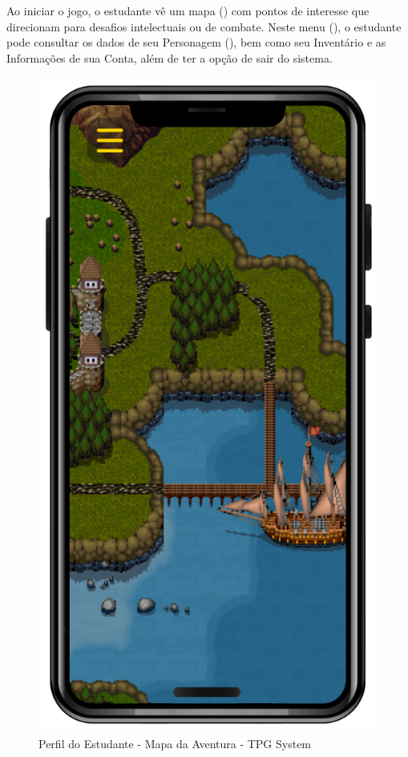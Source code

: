 Ao iniciar o jogo, o estudante vê um mapa () com pontos de interesse que direcionam para desafios intelectuais ou de combate. Neste menu (), o estudante pode consultar os dados de seu Personagem (), bem como seu Inventário e as Informações de sua Conta, além de ter a opção de sair do sistema.
\\

\begin{figure}[!h]
\centering
\caption{Perfil do Estudante - Mapa da Aventura - TPG System}%
\label{fig:Tela13}
\includegraphics[scale=0.20]{Illustrations/Tela13.png}
\end{figure}

